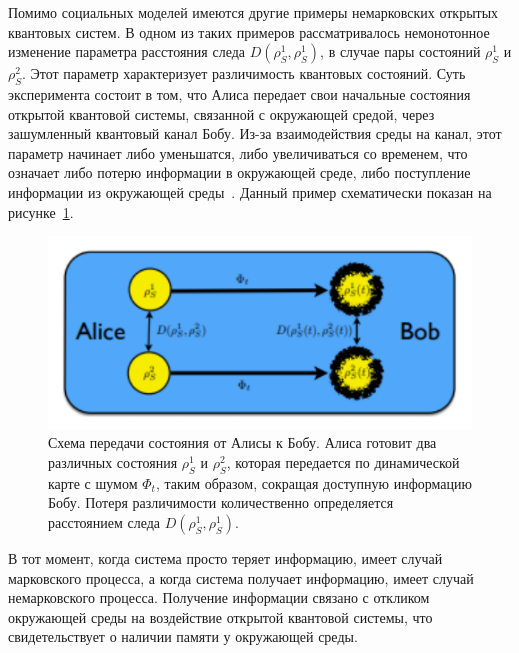 Помимо социальных моделей имеются другие примеры немарковских открытых квантовых систем.
В одном из таких примеров рассматривалось немонотонное изменение параметра расстояния следа
$D(\rho^{1}_{S}, \rho^{1}_{S})$, в случае пары состояний $\rho^{1}_{S}$ и $\rho^{2}_{S}$.
Этот параметр характеризует различимость квантовых состояний.
Суть эксперимента состоит в том, что Алиса передает свои начальные состояния открытой квантовой
системы, связанной с окружающей средой, через зашумленный квантовый канал Бобу.
Из-за взаимодействия среды на канал, этот параметр начинает либо уменьшатся, либо увеличиваться со временем,
что означает либо потерю информации в окружающей среде, либо поступление информации из окружающей среды~\citep{breuer2016colloquium}.
Данный пример схематически показан на рисунке~\ref{fig:state_from_alice_to_bob}.
\begin{figure}[h!]
    \centering
    \captionsetup{justification=centering}
    \includegraphics[width=0.7\linewidth]{pictures/state_alice_bob.png}
    \caption{Схема передачи состояния от Алисы к Бобу. Алиса готовит два различных состояния
    $\rho^{1}_{S}$ и $\rho^{2}_{S}$, которая передается по динамической карте с шумом
    $\Phi_{t}$, таким образом, сокращая доступную информацию Бобу. Потеря различимости количественно
    определяется расстоянием следа $D(\rho^{1}_{S}, \rho^{1}_{S})$.~\citep{breuer2016colloquium}}
    \label{fig:state_from_alice_to_bob}
\end{figure}
В тот момент, когда система просто теряет информацию, имеет случай марковского процесса, а когда
система получает информацию, имеет случай немарковского процесса.
Получение информации связано с откликом окружающей среды на воздействие открытой квантовой системы,
что свидетельствует о наличии памяти у окружающей среды.

